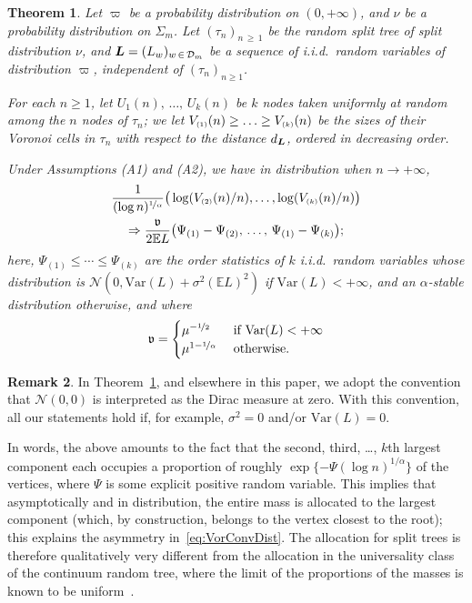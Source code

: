 \documentclass[10pt]{amsart}
\newtheorem{theo}{Theorem}[section]
\theoremstyle{definition}\newtheorem{defi}[theo]{Definition}\newtheorem{rema}[theo]{Remark}\newtheorem{exam}[theo]{Example}\newtheorem{exem}[theo]{Example}\newtheorem{nota}[theo]{Notation}
\newcommand{\bs}{\ensuremath{\boldsymbol}}
\newcommand{\sss}{\ensuremath{\scriptscriptstyle}}
\newcommand{\bbE}{\mathbb{E}}
\newcommand{\clD}{\mathcal{D}}
\newcommand{\clN}{\mathcal{N}}
\newcommand{\Var}{\mathrm{Var}}
\newcommand{\frkv}{\mathfrak{v}}
\begin{document}
\begin{theo}\label{th:voronoi}
Let $\varpi$ be a probability distribution on $(0,+\infty)$, and $\nu$ be a probability distribution on $\Sigma_m$. Let $(\tau_n)_{n\,\geq\,1}$ be the random split tree of split distribution $\nu$, and $\bs L = (L_w)_{w\,\in\,\clD_m}$ be a sequence of i.i.d.\ random variables of distribution $\varpi$, independent of $(\tau_n)_{n\geq 1}$.

For each $n\geq 1$, let $U_1(n),\,\ldots,\,U_k(n)$ be $k$ nodes taken uniformly at random among the $n$ nodes of $\tau_n$; we let $V_{\sss (1)}(n)\geq \ldots \geq V_{\sss (k)}(n)$ be the sizes of their Voronoi cells in $\tau_n$ with respect to the distance $d_{\bs L}$, ordered in decreasing order.

Under Assumptions {\rm (A1)} and {\rm (A2)}, we have in distribution when $n\to+\infty$,
\begin{multline}\label{eq:VorConvDist}
\frac1{(\log n)^{\nicefrac1\alpha}}\big(\log (V_{\sss (2)}(n)/n), \ldots, \log (V_{\sss (k)}(n)/n)\big)\\ \Rightarrow
\frac{\frkv}{2\bbE L}
\big(\Psi_{(1)}-\Psi_{(2)}, \,\ldots,\, \Psi_{(1)}-\Psi_{(k)}\big);
\end{multline}
here, $\Psi_{(1)}\leq \cdots\leq \Psi_{(k)}$ are the order statistics of $k$ i.i.d.\ random variables whose distribution is $\clN(0, \Var(L) + \sigma^2 (\bbE L)^2)$ if $\Var(L)<+\infty$, and an $\alpha$-stable distribution otherwise, and where
\begin{equation}\label{eq:def_frak_v}
\frkv =
\begin{cases}
\mu^{-\nicefrac12} & \text{ if }\Var(L)<+\infty\\
\mu^{1-\nicefrac1\alpha} &\text{ otherwise.}
\end{cases}
\end{equation}
\end{theo}

\begin{rema}
In Theorem~\ref{th:voronoi}, and elsewhere in this paper, we adopt the convention that $\clN(0,0)$ is interpreted as the Dirac measure at zero. With this convention, all our statements hold if, for example, $\sigma^2 = 0$ and/or $\Var(L)=0$.
\end{rema}

In words, the above amounts to the fact that the second, third, \dots, $k$th largest component each occupies a proportion of roughly $\exp\{-\Psi(\log n)^{1/\alpha}\}$ of the vertices, where $\Psi$ is some explicit positive random variable. This implies that asymptotically and in distribution, the entire mass is allocated to the largest component (which, by construction, belongs to the vertex closest to the root); this explains the asymmetry in~\eqref{eq:VorConvDist}. The allocation for split trees is therefore qualitatively very different from the allocation in the universality class of the continuum random tree, where the limit of the proportions of the masses is known to be uniform~\cite{Chapuy}.
\end{document}
